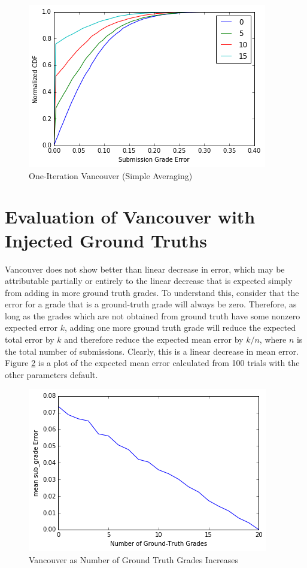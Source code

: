\documentclass{article}
\begin{document}
	\begin{figure}[h]
		\includegraphics{vancouver-1-step.png}
		\caption{One-Iteration Vancouver (Simple Averaging)}
		\label{fig:vancouver-1-step}
	\end{figure}
	

	\section{Evaluation of Vancouver with Injected Ground Truths}
	Vancouver does not show better than linear decrease in error, which may be attributable partially or entirely to the linear decrease that is expected simply from adding in more ground truth grades. To understand this, consider that the error for a grade that is a ground-truth grade will always be zero. Therefore, as long as the grades which are not obtained from ground truth have some nonzero expected error $k$, adding one more ground truth grade will reduce the expected total error by $k$ and therefore reduce the expected mean error by $k/n$, where $n$ is the total number of submissions. Clearly, this is a linear decrease in mean error. Figure \ref{fig:vancouver-vs-ground-truth-cover} is a plot of the expected mean error calculated from 100 trials with the other parameters default.
	
	\begin{figure}[h]
		\includegraphics{vancouver-vs-ground-truth-cover.png}
		\caption{Vancouver as Number of Ground Truth Grades Increases}
		\label{fig:vancouver-vs-ground-truth-cover}
	\end{figure}
	
\end{document}
